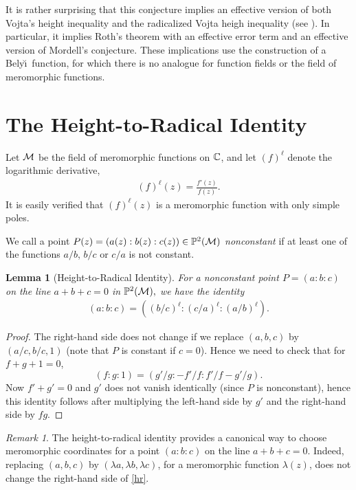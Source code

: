 \documentclass{amsart}
\newcommand\logder{\ell}
\newtheorem{lemma}[theorem]{Lemma}
\theoremstyle{definition}\newtheorem{definition}[theorem]{Definition}
\theoremstyle{remark}\newtheorem{remark}[theorem]{Remark}
\numberwithin{equation}{section}
\begin{document}
It is rather surprising that this conjecture implies an effective version of both Vojta's height inequality \cite{abcvhi} and the radicalized Vojta heigh inequality \cite{abcrvhi} (see \cite[Conjectures 2.1 and 2.3]{VojtaABC}).
In particular,
it implies Roth's theorem with an effective error term and an effective version of Mordell's conjecture.
These implications use the construction of a Bely\u\i\ function,
for which there is no analogue for function fields or the field of meromorphic functions.

\section{The Height-to-Radical Identity}

Let $\mathcal{M}$ be the field of meromorphic functions on $\mathbb{C}$,
and let $(f)^\logder$ denote the logarithmic derivative,
\begin{gather*}
(f)^\logder(z)=\frac{f'(z)}{f(z)}.
\end{gather*}
It is easily verified that $(f)^\logder(z)$ is a meromorphic function with only simple poles.

We call a point $P(z)=(a(z):b(z):c(z))\in\mathbb{P}^2(\mathcal{M})$ {\em nonconstant\/} if at least one of the functions $a/b$,
$b/c$ or $c/a$ is not constant.

\begin{lemma}[Height-to-Radical Identity]
For a nonconstant point $P=(a:b:c)$ on the line $a+b+c=0$ in $\mathbb{P}^2(\mathcal{M}),$
we have the identity
\begin{gather}\label{hr}
(a:b:c)=\left((b/c)^\logder:(c/a)^\logder:(a/b)^\logder\right).
\end{gather}
\end{lemma}

\begin{proof}
The right-hand side does not change if we replace $(a,b,c)$ by $(a/c,b/c,1)$ (note that $P$ is constant if $c=0$).
Hence we need to check that for $f+g+1=0$,
$$
(f:g:1)=\left({g'}/{g}:-{f'}/{f}:{f'}/f-{g'}/{g}\right).
$$
Now $f'+g'=0$ and $g'$ does not vanish identically (since $P$ is nonconstant),
hence this identity follows after multiplying the left-hand side by $g'$ and the right-hand side by $fg$.
\end{proof}

\begin{remark}
The height-to-radical identity provides a canonical way to choose meromorphic coordinates for a point $(a:b:c)$ on the line
 $a+b+c=0$.
Indeed,
replacing $(a,b,c)$ by $(\lambda a,\lambda b,\lambda c)$,
for a meromorphic function $\lambda(z)$,
 does not change the right-hand side of \eqref{hr}.
\end{remark}
\end{document}
